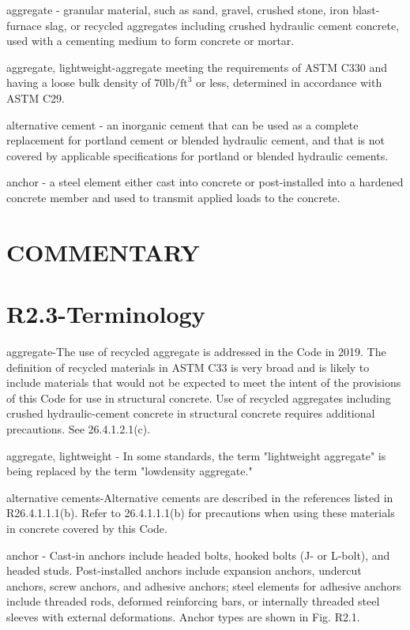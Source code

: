\documentclass[10pt]{article}
\begin{document}
aggregate - granular material, such as sand, gravel, crushed stone, iron blast-furnace slag, or recycled aggregates including crushed hydraulic cement concrete, used with a cementing medium to form concrete or mortar.

aggregate, lightweight-aggregate meeting the requirements of ASTM C330 and having a loose bulk density of $70 \mathrm{lb} / \mathrm{ft}^{3}$ or less, determined in accordance with ASTM C29.

alternative cement - an inorganic cement that can be used as a complete replacement for portland cement or blended hydraulic cement, and that is not covered by applicable specifications for portland or blended hydraulic cements.

anchor - a steel element either cast into concrete or post-installed into a hardened concrete member and used to transmit applied loads to the concrete.

\section*{COMMENTARY}
\section*{R2.3-Terminology}
aggregate-The use of recycled aggregate is addressed in the Code in 2019. The definition of recycled materials in ASTM C33 is very broad and is likely to include materials that would not be expected to meet the intent of the provisions of this Code for use in structural concrete. Use of recycled aggregates including crushed hydraulic-cement concrete in structural concrete requires additional precautions. See 26.4.1.2.1(c).

aggregate, lightweight - In some standards, the term "lightweight aggregate" is being replaced by the term "lowdensity aggregate."

alternative cements-Alternative cements are described in the references listed in R26.4.1.1.1(b). Refer to 26.4.1.1.1(b) for precautions when using these materials in concrete covered by this Code.

anchor - Cast-in anchors include headed bolts, hooked bolts (J- or L-bolt), and headed studs. Post-installed anchors include expansion anchors, undercut anchors, screw anchors, and adhesive anchors; steel elements for adhesive anchors include threaded rods, deformed reinforcing bars, or internally threaded steel sleeves with external deformations. Anchor types are shown in Fig. R2.1.
\end{document}
